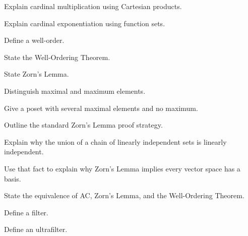 \begin{exercise}[3]
Explain cardinal multiplication using Cartesian products.
\end{exercise}

\begin{exercise}[3]
Explain cardinal exponentiation using function sets.
\end{exercise}

\begin{exercise}[2]
Define a well-order.
\end{exercise}

\begin{exercise}[3]
State the Well-Ordering Theorem.
\end{exercise}

\begin{exercise}[3]
State Zorn's Lemma.
\end{exercise}

\begin{exercise}[3]
Distinguish maximal and maximum elements.
\end{exercise}

\begin{exercise}[3]
Give a poset with several maximal elements and no maximum.
\end{exercise}

\begin{exercise}[3]
Outline the standard Zorn's Lemma proof strategy.
\end{exercise}

\begin{exercise}[3]
Explain why the union of a chain of linearly independent sets is linearly
independent.
\end{exercise}

\begin{exercise}[3]
Use that fact to explain why Zorn's Lemma implies every vector space has a
basis.
\end{exercise}

\begin{exercise}[3]
State the equivalence of AC, Zorn's Lemma, and the Well-Ordering Theorem.
\end{exercise}

\begin{exercise}[3]
Define a filter.
\end{exercise}

\begin{exercise}[3]
Define an ultrafilter.
\end{exercise}


